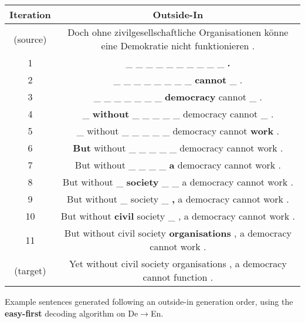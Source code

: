 \centering
\footnotesize
\begin{tabular}{cc}
\toprule
Iteration & {\color{violet} Outside-In} \\
\midrule
(source) & Doch ohne zivilgesellschaftliche Organisationen könne eine Demokratie nicht funktionieren . \\
1 &  \_ \_ \_ \_ \_ \_ \_ \_ \_ \_ \textbf{.} \\ 
2 &  \_ \_ \_ \_ \_ \_ \_ \_ \textbf{cannot} \_ . \\ 
3 &  \_ \_ \_ \_ \_ \_ \_ \textbf{democracy} cannot \_ . \\ 
4 &  \_ \textbf{without} \_ \_ \_ \_ \_ democracy cannot \_ . \\ 
5 &  \_ without \_ \_ \_ \_ \_ democracy cannot \textbf{work} . \\ 
6 &  \textbf{But} without \_ \_ \_ \_ \_ democracy cannot work . \\ 
7 &  But without \_ \_ \_ \_ \textbf{a} democracy cannot work . \\ 
8 &  But without \_ \textbf{society} \_ \_ a democracy cannot work . \\ 
9 &  But without \_ society \_ \textbf{,} a democracy cannot work . \\ 
10 & But without \textbf{civil} society \_ , a democracy cannot work . \\ 
11 & But without civil society \textbf{organisations} , a democracy cannot work . \\ 
(target) & Yet without civil society organisations , a democracy cannot function . \\

\bottomrule
\end{tabular}

\caption{Example sentences generated following an {\color{violet} outside-in} generation order, using the \textbf{easy-first} decoding algorithm on De$\rightarrow$En.}